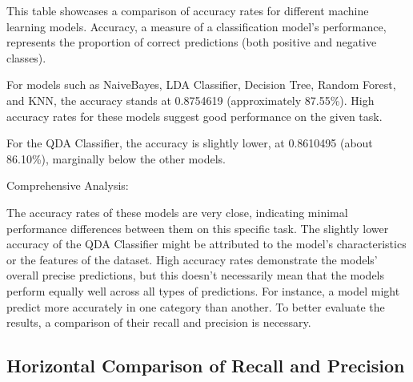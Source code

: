 \documentclass[
]{article}
\begin{document}
This table showcases a comparison of accuracy rates for different
machine learning models. Accuracy, a measure of a classification model's
performance, represents the proportion of correct predictions (both
positive and negative classes).

For models such as NaiveBayes, LDA Classifier, Decision Tree, Random
Forest, and KNN, the accuracy stands at 0.8754619 (approximately
87.55\%). High accuracy rates for these models suggest good performance
on the given task.

For the QDA Classifier, the accuracy is slightly lower, at 0.8610495
(about 86.10\%), marginally below the other models.

Comprehensive Analysis:

The accuracy rates of these models are very close, indicating minimal
performance differences between them on this specific task. The slightly
lower accuracy of the QDA Classifier might be attributed to the model's
characteristics or the features of the dataset. High accuracy rates
demonstrate the models' overall precise predictions, but this doesn't
necessarily mean that the models perform equally well across all types
of predictions. For instance, a model might predict more accurately in
one category than another. To better evaluate the results, a comparison
of their recall and precision is necessary.

\hypertarget{horizontal-comparison-of-recall-and-precision}{%
\subsection{Horizontal Comparison of Recall and
Precision}\label{horizontal-comparison-of-recall-and-precision}}
\end{document}
